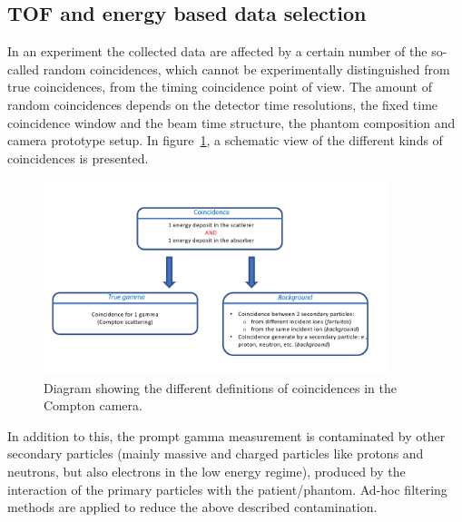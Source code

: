 \subsection{TOF and energy based data selection}\label{chap4::subsec::MatMeth::TOF_Ecut}

In an experiment the collected data are affected by a certain number of the so-called random coincidences, which cannot be experimentally distinguished from true coincidences, from the timing coincidence point of view. The amount of random coincidences depends on the detector time resolutions, the fixed time coincidence window and the beam time structure, the phantom composition and camera prototype setup. In figure~\ref{chap4::fig::coincidence_CC_simulation_Hadronth}, a schematic view of the different kinds of coincidences is presented.

\begin{figure}
  \centering
  \includegraphics[width=0.9\textwidth]{03_GraphicFiles/chapter4_HTsimu/coincidences.pdf}
  \caption{Diagram showing the different definitions of coincidences in the Compton camera.}
  \label{chap4::fig::coincidence_CC_simulation_Hadronth}
\end{figure}

In addition to this, the prompt gamma measurement is contaminated by other secondary particles (mainly massive and charged particles like protons and neutrons, but also electrons in the low energy regime), produced by the interaction of the primary particles with the patient/phantom.
Ad-hoc filtering methods are applied to reduce the above described contamination.

